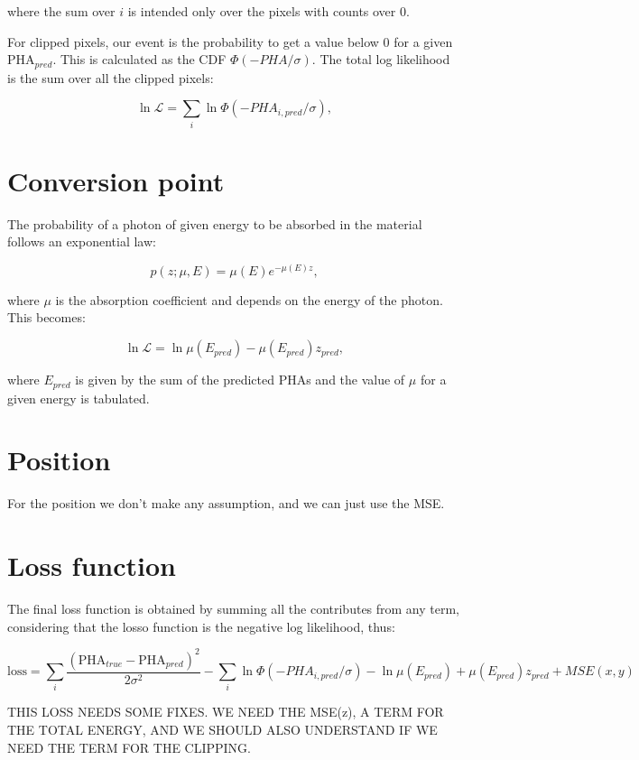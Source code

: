 where the sum over $i$ is intended only over the pixels with counts over 0.

For clipped pixels, our event is the probability to get a value below 0 for a given PHA$_{pred}$. This is calculated as the CDF $\Phi(-PHA/\sigma)$. The total log likelihood is the sum over all the clipped pixels:

\begin{equation}
\ln \mathcal{L} = \sum_i \ln \Phi(-PHA_{i, pred}/\sigma),
\end{equation}

\section{Conversion point}
The probability of a photon of given energy to be absorbed in the material follows an exponential law:

\begin{equation}
p(z; \mu, E) = \mu(E)e^{-\mu(E)z},
\end{equation}

where $\mu$ is the absorption coefficient and depends on the energy of the photon. This becomes:

\begin{equation}
\ln \mathcal{L} = \ln \mu(E_{pred}) - \mu(E_{pred})z_{pred},
\end{equation}

where $E_{pred}$ is given by the sum of the predicted PHAs and the value of $\mu$ for a given energy is tabulated.

\section{Position}
For the position we don't make any assumption, and we can just use the MSE.

\section{Loss function}
The final loss function is obtained by summing all the contributes from any term, considering that the losso function is the negative log likelihood, thus:

\begin{equation}
\textrm{loss} = \sum_i \frac{(\textrm{PHA}_{true} - \textrm{PHA}_{pred})^2}{2\sigma^2} - \sum_i \ln \Phi(-PHA_{i, pred}/\sigma) - \ln \mu(E_{pred}) + \mu(E_{pred})z_{pred} + MSE(x, y)
\end{equation}

THIS LOSS NEEDS SOME FIXES. WE NEED THE MSE(z), A TERM FOR THE TOTAL ENERGY, AND WE SHOULD ALSO UNDERSTAND IF WE NEED THE TERM FOR THE CLIPPING.




